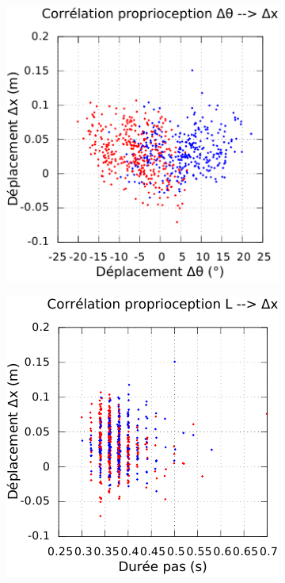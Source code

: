 \begin{figure}[htbp]
\begin{subfigure}{0.22\paperwidth}
    \end{subfigure}
    \begin{subfigure}{0.22\paperwidth}
        \centering
        \includegraphics[type=pdf,ext=.pdf,read=.pdf,width=1.0\linewidth]{../plot/OdometryLWPR/grass_close_function_read_yaw_x}
    \end{subfigure}
    \begin{subfigure}{0.22\paperwidth}
        \centering
        \includegraphics[type=pdf,ext=.pdf,read=.pdf,width=1.0\linewidth]{../plot/OdometryLWPR/grass_close_function_read_len_x}

\end{subfigure}
\end{figure}
